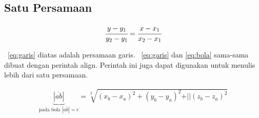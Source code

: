 \chapter{\babTiga}
\label{ch:priorWorks}


\section{Satu Persamaan}

\noindent \begin{align}\label{eq:garis}
	\cfrac{y - y_{1}}{y_{2} - y_{1}} = 
	\cfrac{x - x_{1}}{x_{2} - x_{1}}
\end{align}

\equ~\ref{eq:garis} diatas adalah persamaan garis. 
\equ~\ref{eq:garis} dan \ref{eq:bola} sama-sama dibuat dengan perintah \bslash
align. 
Perintah ini juga dapat digunakan untuk menulis lebih dari satu persamaan. 

\noindent \begin{align}\label{eq:bola}
	\underbrace{|\overline{ab}|}_{\text{pada bola $|\overline{ab}| = r$}} 
		= \sqrt[2]{(x_{b} - x_{a})^{2} + (y_{b} - y_{a})^{2} + 
				\vert\vert(z_{b} - z_{a})^{2}}
\end{align}

